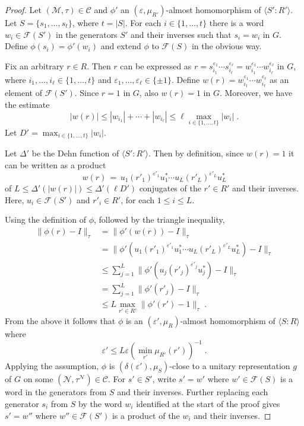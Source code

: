 \documentclass[11pt]{article}
\theoremstyle{definition}
\newcommand{\mC}{\ensuremath{\mathcal{C}}}
\newcommand{\cM}{\ensuremath{\mathcal{M}}}
\newcommand{\eps}{\varepsilon}
\newcommand{\mN}{\mathcal{N}}
\begin{document}
\begin{proof}
Let $(\cM,\tau)\in \mC$ and $\phi'$ an $(\eps,\mu_{R'})$-almost homomorphism of $\langle S':R'\rangle$. Let $S=\{s_1,\ldots,s_t\}$, where $t=|S|$. For each $i\in\{1,\ldots,t\}$ there is a word $w_i\in \mathcal{F}(S')$ in the generators $S'$ and their inverses such that $s_i=w_i$ in $G$. Define $\phi(s_i)=\phi'(w_i)$ and extend $\phi$ to $\mathcal{F}(S)$ in the obvious way.

Fix an arbitrary $r\in R$. Then $r$ can be expressed as $r=s_{i_1}^{\eps_1}\cdots s_{i_\ell}^{\eps_\ell}=w_{i_1}^{\eps_1}\cdots w_{i_\ell}^{\eps_\ell}$ in $G$, where $i_1,\ldots,i_\ell\in \{1,\ldots,t\}$ and $\eps_1,\ldots,\eps_\ell\in\{\pm 1\}$. Define $w(r) = w_{i_1}^{\eps_1}\cdots w_{i_\ell}^{\eps_\ell}$ as an element of $\mathcal{F}(S')$. Since $r=1$ in $G$, also $w(r)=1$ in $G$. Moreover, we have the estimate 
\[ |w(r)| \leq |w_{i_1}|+\cdots+|w_{i_\ell}|\leq \ell \max_{i\in \{1,\ldots,t\}}|w_i|\;.\]
Let $D'=\max_{i\in \{1,\ldots,t\}}|w_i|$. 

Let $\Delta'$ be the Dehn function of $\langle S':R'\rangle$. Then by definition, since $w(r)=1$ it can be written as a product 
\[ w(r)\,=\, u_1 (r'_{1})^{\eps'_1} u_1^* \cdots u_L (r'_{L})^{\eps'_L}u_L^* \]
of $L\leq \Delta'(|w(r)|) \leq \Delta'(\ell D')$ conjugates of the $r'\in R'$ and their inverses. Here, $u_i\in \mathcal{F}(S')$ and $r'_i\in R'$, for each $1\leq i \leq L$. 

Using the definition of $\phi$, followed by the triangle inequality, 
\begin{align*}
\|\phi(r)-I\|_\tau &= \|\phi'(w(r))-I\|_\tau\\
&= \|\phi'( u_1 (r'_{1})^{\eps'_1}u_1^* \cdots u_L (r'_{L})^{\eps'_L} u_L^* ) - I \|_\tau\\
&\leq  \sum_{j=1}^L \|\phi'( u_j (r'_{j})^{\eps'_j}u_j^* ) - I \|_\tau\\
&=  \sum_{j=1}^L \|\phi'( r'_{j}) - I \|_\tau\\
&\leq L \max_{r'\in R'} \|\phi'(r')-1\|_\tau\;.
\end{align*}
 From the above it follows that $\phi$ is an $(\eps',\mu_R)$-almost homomorphism of $\langle S:R\rangle$ where 
\[\eps' \leq  L \eps (\min_{r'}\mu_{R'}(r'))^{-1} \;.\]
Applying the assumption, $\phi$ is $(\delta(\eps'),\mu_S)$-close to a unitary representation $g$ of $G$ on some $(\mathcal{N}, \tau^\mN)\in \mC$. 
For $s'\in S'$, write $s' = w'$ where $w'\in\mathcal{F}(S)$ is a word in the generators from $S$ and their inverses. Further replacing each generator $s_i$ from $S$ by the word $w_i$ identified at the start of the proof gives $s'=w''$ where $w''\in \mathcal{F}(S')$ is a product of the $w_i$ and their inverses. 


\end{proof}
\end{document}

